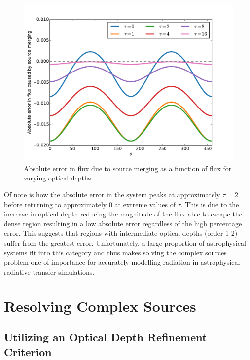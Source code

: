 \begin{figure} [H]
    \centering
    \includegraphics[width=\textwidth]{plots/CH4/CSAbsError.pdf}
    \caption{Absolute error in flux due to source merging as a function of flux for varying optical depths}
    \label{fig:CSAbsError}
\end{figure}

Of note is how the absolute error in the system peaks at approximately $\tau = 2$ before returning to approximately 0 at extreme values of $\tau$. This is due to the increase in optical depth reducing the magnitude of the flux able to escape the dense region resulting in a low absolute error regardless of the high percentage error. This suggests that regions with intermediate optical depths (order 1-2) suffer from the greatest error. Unfortunately, a large proportion of astrophysical systems fit into this category and thus makes solving the complex sources problem one of importance for accurately modelling radiation in astrophysical radiative transfer simulations.

\section{Resolving Complex Sources}

\subsection{Utilizing an Optical Depth Refinement Criterion}

